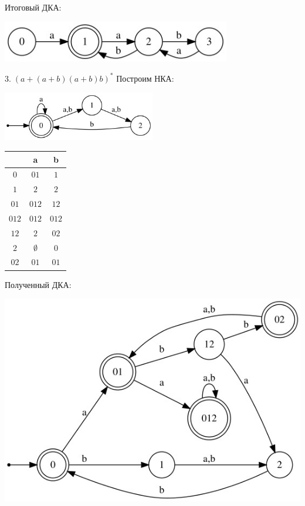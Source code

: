 \documentclass[a4paper,12pt]{article}
\begin{document}
Итоговый ДКА:
\begin{center}
\includegraphics[width=0.75\textwidth]{3_2_1}\newline
\end{center}
\Large $3.\;(a+(a+b)(a+b)b)^*$\newline
Построим НКА:
\begin{center}
\includegraphics[width=0.5\textwidth]{3_3_nka}\newline
\end{center}
\begin{center}
\begin{tabular}{ |c|c|c| } 
\hline
  & a & b \\ [0.5ex] 
 \hline
$0$ & $01$ & $1$ \\
$1$ & $2$ & $2$ \\
$01$ & $012$ & $12$ \\
$012$ & $012$ & $012$ \\
$12$ & $2$ & $02$ \\
$2$ & $\emptyset$ & $0$ \\
$02$ & $01$ & $01$ \\
 \hline
\end{tabular}
\end{center}
Полученный ДКА:
\begin{center}
\includegraphics[width=1.15\textwidth]{3_3}\newline
\end{center}
\end{document}
